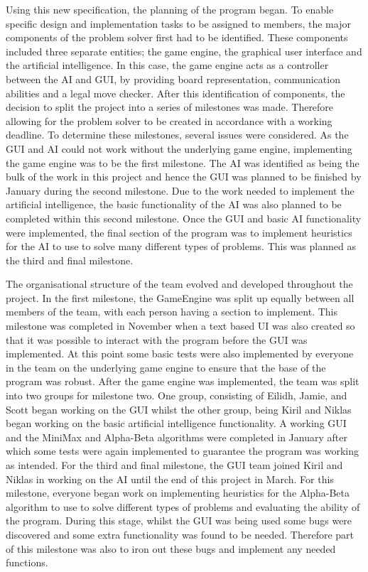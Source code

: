 \documentclass{l3proj}
\begin{document}
Using this new specification, the planning of the program began. To enable specific design and implementation tasks to be assigned to members, the major components of the problem solver first had to be identified. These components included three separate entities; the game engine, the graphical user interface and the artificial intelligence. In this case, the game engine acts as a controller between the AI and GUI, by providing board representation, communication abilities and a legal move checker. After this identification of components, the decision to split the project into a series of milestones was made. Therefore allowing for the problem solver to be created in accordance with a working deadline. To determine these milestones, several issues were considered. As the GUI and AI could not work without the underlying game engine, implementing the game engine was to be the first milestone. The AI was identified as being the bulk of the work in this project and hence the GUI was planned to be finished by January during the second milestone. Due to the work needed to implement the artificial intelligence, the basic functionality of the AI was also planned to be completed within this second milestone. Once the GUI and basic AI functionality were implemented, the final section of the program was to implement heuristics for the AI to use to solve many different types of problems.  This was planned as the third and final milestone.

The organisational structure of the team evolved and developed throughout the project. In the first milestone, the GameEngine was split up equally between all members of the team, with each person having a section to implement. This milestone was completed in November when a text based UI was also created so that it was possible to interact with the program before the GUI was implemented. At this point some basic tests were also implemented by everyone in the team on the underlying game engine to ensure that the base of the program was robust. After the game engine was implemented, the team was split into two groups for milestone two. One group, consisting of Eilidh, Jamie, and Scott began working on the GUI whilst the other group, being Kiril and Niklas began working on the basic artificial intelligence functionality.  A working GUI and the MiniMax and Alpha-Beta algorithms were completed in January after which some tests were again implemented to guarantee the program was working as intended. For the third and final milestone, the GUI team joined Kiril and Niklas in working on the AI until the end of this project in March.  For this milestone, everyone began work on implementing heuristics for the Alpha-Beta algorithm to use to solve different types of problems and evaluating the ability of the program. During this stage, whilst the GUI was being used some bugs were discovered and some extra functionality was found to be needed. Therefore part of this milestone was also to iron out these bugs and implement any needed functions.
\end{document}
